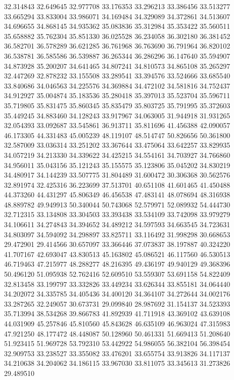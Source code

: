 32.314843
32.649645
32.977708
33.176353
33.296213
33.386456
33.513277
33.665294
33.833004
33.986071
34.169484
34.329089
34.372861
34.513607
34.696655
34.868145
34.935362
35.083836
35.312984
35.353422
35.560511
35.658882
35.762304
35.851330
36.025528
36.234058
36.302180
36.381452
36.582701
36.578289
36.621285
36.761968
36.763690
36.791964
36.820102
36.538781
36.585586
36.539887
36.265344
36.286296
36.147640
35.594907
34.873928
35.200207
34.641465
34.807241
34.810573
34.865108
35.265297
32.447269
32.878232
33.155508
33.289541
33.394576
33.524666
33.685540
33.840686
34.046563
34.225576
34.369884
34.472102
34.581816
34.752437
34.912927
35.004874
35.183536
35.280418
35.397013
35.523704
35.596711
35.719805
35.831475
35.860345
35.835479
35.803725
35.791995
35.372603
35.449245
34.883460
34.128243
33.917967
34.063005
31.944918
31.931265
32.054393
33.092687
33.545861
36.913711
35.811696
41.456388
42.090057
46.173305
44.331483
45.005239
48.119107
48.514747
50.826656
50.361800
32.587009
33.036314
33.251202
33.367644
33.475064
33.642257
33.829935
34.057219
34.213330
34.339622
34.425215
34.554161
34.703927
34.766860
34.956011
35.043156
35.121243
35.155575
35.123806
35.045202
34.830219
34.480917
34.144239
33.507775
31.804489
31.600472
30.306368
30.562576
32.891974
32.425316
36.223699
37.513701
40.651108
41.601465
41.450488
44.373260
44.431297
45.806349
46.456538
47.483141
48.078694
48.316938
48.889782
49.949913
50.340044
50.743068
52.579971
52.089932
54.444730
32.712315
33.134808
33.304503
33.393438
33.534109
33.742098
33.979279
34.106611
34.274843
34.394652
34.489212
34.597593
34.663545
34.723631
34.803097
34.594092
34.298897
33.825711
33.116492
31.998298
30.668653
29.472901
29.414566
30.657097
33.366446
37.073837
38.197887
40.324220
41.707167
42.693047
43.830513
45.163802
45.086521
46.117560
46.530513
46.719463
47.215977
48.288277
48.216395
49.436197
49.940129
49.368396
50.496120
51.095938
52.762416
52.609510
53.559307
53.691158
54.822409
32.813458
33.199797
33.332826
33.449234
33.626344
33.855181
34.064440
34.202072
34.335785
34.405436
34.400120
34.364107
34.272644
34.002176
33.287265
32.249057
30.673731
29.099840
28.987692
31.154137
34.523393
35.713994
38.534268
39.866783
41.892939
41.711918
43.369102
43.639108
44.031909
45.257846
45.810560
45.843628
46.635109
46.963024
47.315983
47.921250
48.177472
48.448087
50.128960
50.461331
51.669413
51.208640
51.923415
51.969728
53.792310
53.442922
54.986055
56.382104
56.398454
32.909753
33.238527
33.355082
33.476201
33.655754
33.913826
34.117137
34.210638
34.204062
34.186115
33.967030
33.811075
33.345613
31.273826
29.489510

